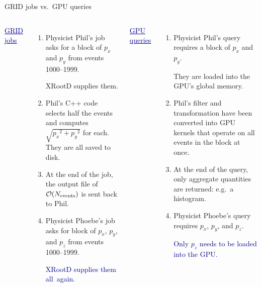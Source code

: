 \documentclass{beamer}
\begin{document}
\begin{frame}{GRID jobs vs.\ GPU queries}
\vspace{0.25 cm}
\small
\begin{columns}[t]
\textcolor{darkblue}{\underline{GRID jobs}}
\begin{enumerate}
\item Physicist Phil's job asks for a block of $p_x$ and $p_y$ from events 1000--1999.

XRootD supplies them.

\item Phil's C++ code selects half the events and computes $\sqrt{{p_x}^2 + {p_y}^2}$ for each. They are all saved to disk.

\item At the end of the job, the output file of $\mathcal{O}(N_{\mbox{\scriptsize events}})$ is sent back to Phil.

\item Physicist Phoebe's job asks for block of $p_x$, $p_y$, and $p_z$ from events 1000--1999.

\textcolor{darkblue}{XRootD supplies them \mbox{all again.\hspace{-1 cm}}}
\end{enumerate}

\textcolor{darkblue}{\underline{GPU queries}}
\begin{enumerate}
\item Physicist Phil's query requires a block of $p_x$ and $p_y$.

They are loaded into the GPU's global memory.

\item Phil's filter and transformation have been converted into GPU kernels that operate on all events in the block at once.

\item At the end of the query, only aggregate quantities are returned: e.g.\ a histogram.

\item Physicist Phoebe's query requires $p_x$, $p_y$, and $p_z$.

\textcolor{darkblue}{Only $p_z$ needs to be loaded into the GPU.}
\end{enumerate}
\end{columns}
\end{frame}
\end{document}
